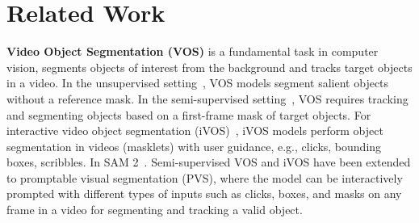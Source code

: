 \section{Related Work}
\label{sec:formatting}

{\bf Video Object Segmentation (VOS)} is a fundamental task in computer vision, segments objects of interest from the background and tracks target objects in a video. 
In the unsupervised setting~\citep{grundmann2010efficient,brox2010object,lee2011key,xu2012evaluation,fragkiadaki2012video,perazzi2012saliency,zhang2013video,li2013video,papazoglou2013fast,faktor2014video,wang2015saliency,taylor2015causal,perazzi2016benchmark}, VOS models segment salient objects without a reference mask. In the semi-supervised setting~\citep{pont20172017,xu2018youtube,oh2019video,bhat2020learning,robinson2020learning,li2022recurrent,yang2022decoupling,cheng2022xmem,zhang2023joint,wang2023look,wu2023scalable,cheng2024putting,yang2024scalable}, VOS requires tracking and segmenting objects based on a first-frame mask of target objects. For interactive video object segmentation (iVOS)~\citep{caelles20182018,heo2020interactive,cheng2021modular,homayounfar2021videoclick,yang2023track,cheng2023segment,rajivc2023segment,cheng2024putting,delatolas2024learning}, iVOS models perform object segmentation in videos (masklets) with user guidance, e.g., clicks, bounding boxes, scribbles. In SAM 2~\citep{ravi2024sam}. Semi-supervised VOS and iVOS have been extended to promptable visual segmentation (PVS), where the model can be interactively prompted with different types of inputs such as clicks, boxes, and masks on any frame in a video for segmenting and tracking a valid object.

